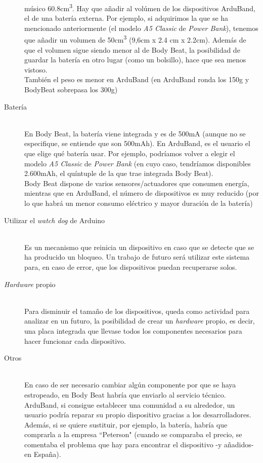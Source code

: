 \begin{description}
    músico 60.8cm\textsuperscript{3}. Hay que añadir al volúmen de los dispositivos ArduBand, el de una batería externa. Por
    ejemplo, si adquirimos la que se ha mencionado anteriormente (el modelo \textit{A5 Classic} de \textit{Power Bank}), tenemos
    que añadir un volumen de 50cm\textsuperscript{3} (9,6cm x 2.4 cm x 2.2cm). Además de que el volumen sigue siendo menor
    al de Body Beat,  la posibilidad de guardar la batería en otro lugar (como un bolsillo), hace que sea menos vistoso.\\
    También el peso es menor en ArduBand (en ArduBand ronda los 150g y BodyBeat sobrepasa los 300g)
  \item[Batería] \hfill \\
    En Body Beat, la batería viene integrada y es de 500mA (aunque no se especifique, se entiende que son 500mAh). En ArduBand,
    es el usuario el que elige qué batería usar. Por ejemplo, podríamos volver a elegir el modelo \textit{A5 Classic}
    de \textit{Power Bank} (en cuyo caso, tendríamos disponibles 2.600mAh, el quíntuple de la que trae integrada Body
    Beat).\\
    Body Beat dispone de varios sensores/actuadores que consumen energía, mientras que en ArduBand, el número
    de dispositivos es muy reducido (por lo que habrá un menor consumo eléctrico y mayor duración
    de la batería)
  \item[Utilizar el \textit{watch dog} de Arduino] \hfill \\
    Es un mecanismo que reinicia un dispositivo en caso que se detecte que se ha producido un bloqueo.
    Un trabajo de futuro será utilizar este sistema para,
    en caso de error, que los dispositivos puedan recuperarse solos.
  \item[\textit{Hardware} propio] \hfill \\
    Para disminuir el tamaño de los dispositivos, queda como actividad para analizar en un futuro, la posibilidad
    de crear un \textit{hardware} propio, es decir, una placa integrada que llevase todos los componentes necesarios
    para hacer funcionar cada dispositivo.
  \item[Otros] \hfill \\
    En caso de ser necesario cambiar algún componente por que se haya estropeado, en Body Beat habría que enviarlo
    al servicio técnico. ArduBand, si consigue establecer una comunidad a su alrededor, un usuario podría reparar
    su propio dispositivo gracias a los desarrolladores. Además, si se quiere sustituir, por ejemplo, la batería,
    habría que comprarla a la empresa ``Peterson" (cuando se comparaba el precio, se comentaba el problema que hay
    para encontrar el dispositivo -y añadidos- en España).
\end{description}



